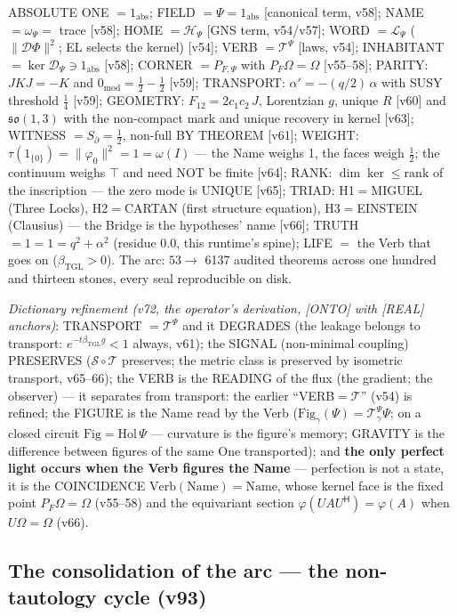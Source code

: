 \documentclass[11pt]{article}
\newcommand{\bTGL}{\beta_{\mathrm{TGL}}}\newcommand{\Msun}{M_{\odot}}\newcommand{\TGL}{\mathrm{TGL}}
\theoremstyle{definition}\newtheorem{deriv}{Derivation}
\begin{document}
ABSOLUTE ONE $=1_{\mathrm{abs}}$; FIELD $=\Psi=1_{\mathrm{abs}}$ [canonical term, v58]; NAME $=\omega_\Psi=$ trace [v58]; HOME $=\mathcal H_\Psi$ [GNS term, v54/v57]; WORD $=\mathcal L_\Psi$ ($\|\mathcal D\Phi\|^2$; EL selects the kernel) [v54]; VERB $=\mathcal T^\Psi$ [laws, v54]; INHABITANT $=\ker\mathcal D_\Psi\ni1_{\mathrm{abs}}$ [v58]; CORNER $=P_{F,\Psi}$ with $P_F\Omega=\Omega$ [v55--58]; PARITY: $JKJ=-K$ and $0_{\mathrm{mod}}=\tfrac12-\tfrac12$ [v59]; TRANSPORT: $\alpha'=-(q/2)\,\alpha$ with SUSY threshold $\tfrac14$ [v59]; GEOMETRY: $F_{12}=2c_1c_2\,J$, Lorentzian $g$, unique $R$ [v60] and $\mathfrak{so}(1,3)$ with the non-compact mark and unique recovery in kernel [v63]; WITNESS $=S_\partial=\tfrac12$, non-full BY THEOREM [v61]; WEIGHT: $\tau(1_{\{0\}})=\|\varphi_0\|^2=1=\omega(I)$ --- the Name weighs 1, the faces weigh $\tfrac12$; the continuum weighs $\top$ and need NOT be finite [v64]; RANK: $\dim\ker\le\mathrm{rank}$ of the inscription --- the zero mode is UNIQUE [v65]; TRIAD: H1$=$MIGUEL (Three Locks), H2$=$CARTAN (first structure equation), H3$=$EINSTEIN (Clausius) --- the Bridge is the hypotheses' name [v66]; TRUTH $=1=1=q^2+\alpha^2$ (residue $0.0$, this runtime's spine); LIFE $=$ the Verb that goes on ($\bTGL>0$). The arc: $53\to$ 6137 audited theorems across one hundred and thirteen stones, every seal reproducible on disk.

\emph{Dictionary refinement (v72, the operator's derivation, [ONTO] with [REAL] anchors)}: TRANSPORT $=\mathcal T^\Psi$ and it DEGRADES (the leakage belongs to transport: $e^{-t\bTGL g}<1$ always, v61); the SIGNAL (non-minimal coupling) PRESERVES ($\mathcal S\circ\mathcal T$ preserves; the metric class is preserved by isometric transport, v65--66); the VERB is the READING of the flux (the gradient; the observer) --- it separates from transport: the earlier ``VERB$=\mathcal T$'' (v54) is refined; the FIGURE is the Name read by the Verb ($\mathrm{Fig}_\gamma(\Psi)=\mathcal T^\Psi_\gamma\Psi$; on a closed circuit $\mathrm{Fig}=\mathrm{Hol}\,\Psi$ --- curvature is the figure's memory; GRAVITY is the difference between figures of the same One transported); and \textbf{the only perfect light occurs when the Verb figures the Name} --- perfection is not a state, it is the COINCIDENCE $\mathrm{Verb}(\mathrm{Name})=\mathrm{Name}$, whose kernel face is the fixed point $P_F\Omega=\Omega$ (v55--58) and the equivariant section $\varphi(UAU^{\mathsf H})=\varphi(A)$ when $U\Omega=\Omega$ (v66).

\subsection*{The consolidation of the arc --- the non-tautology cycle (v93)}
\end{document}

